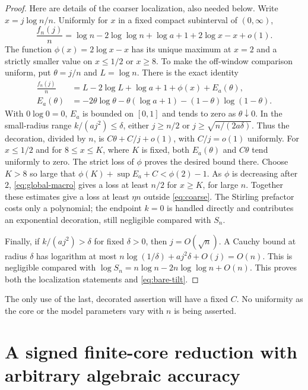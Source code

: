 \documentclass[11pt,a4paper]{article}
\numberwithin{equation}{section}
\theoremstyle{definition}
\theoremstyle{remark}\newtheorem{remark}[theorem]{Remark}
\begin{document}
\begin{proof}
Here are details of the coarser localization, also needed below. Write
$x=j\log n/n$. Uniformly for $x$ in a fixed compact subinterval of $(0,\infty)$,
\begin{equation}
 \frac{f_n(j)}n=
 \log n-2\log\log n+\log a+1+2\log x-x+o(1).
 \label{eq:macro}
\end{equation}
The function $\phi(x)=2\log x-x$ has its unique maximum at $x=2$ and a
strictly smaller value on $x\le1/2$ or $x\ge8$. To make the off-window
comparison uniform, put $\theta=j/n$ and $L=\log n$. There is the exact identity
\begin{align}
 \frac{f_n(j)}n&=L-2\log L+\log a+1+\phi(x)+E_a(\theta),\label{eq:global-macro}\\
 E_a(\theta)&=-2\theta\log\theta-\theta(\log a+1)
                -(1-\theta)\log(1-\theta).\nonumber
\end{align}
With $0\log0=0$, $E_a$ is bounded on $[0,1]$ and tends to zero as
$\theta\downarrow0$. In the small-radius range $k/(aj^2)\le\delta$,
either $j\ge n/2$ or $j\ge\sqrt{n/(2a\delta)}$. Thus the decoration,
divided by $n$, is $C\theta+C/j+o(1)$, with $C/j=o(1)$ uniformly.
For $x\le1/2$ and for $8\le x\le K$, where $K$ is fixed, both
$E_a(\theta)$ and $C\theta$ tend uniformly to zero. The strict loss of
$\phi$ proves the desired bound there. Choose $K>8$ so large that
$\phi(K)+\sup E_a+C<\phi(2)-1$. As $\phi$ is decreasing after $2$,
\eqref{eq:global-macro} gives a loss at least $n/2$ for $x\ge K$,
for large $n$. Together these estimates give a loss at least $\eta n$
outside \eqref{eq:coarse}. The Stirling prefactor costs only a polynomial;
the endpoint $k=0$ is handled directly and contributes an exponential
decoration, still negligible compared with $S_n$.

Finally, if $k/(aj^2)>\delta$ for fixed $\delta>0$, then $j=O(\sqrt n)$.
A Cauchy bound at radius $\delta$ has logarithm at most
$n\log(1/\delta)+aj^2\delta+O(j)=O(n)$.
This is negligible compared with
$\log S_n=n\log n-2n\log\log n+O(n)$.
This proves both the localization statements and \eqref{eq:bare-tilt}.
\end{proof}

The only use of the last, decorated assertion will have a fixed $C$.
No uniformity as the core or the model parameters vary with $n$ is being
asserted.

\section{A signed finite-core reduction with arbitrary algebraic accuracy}
\label{sec:reduction}
\end{document}
